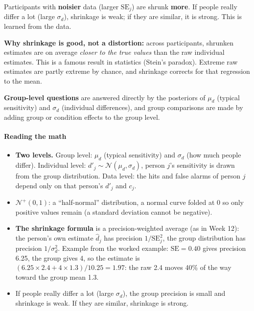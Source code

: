 Participants with \textbf{noisier} data (larger \(\mathrm{SE}_j\)) are
shrunk \textbf{more}. If people really differ a lot (large
\(\sigma_d\)), shrinkage is weak; if they are similar, it is strong.
This is learned from the data.

\textbf{Why shrinkage is good, not a distortion:} across participants,
shrunken estimates are on average \emph{closer to the true values} than
the raw individual estimates. This is a famous result in statistics
(Stein's paradox). Extreme raw estimates are partly extreme by chance,
and shrinkage corrects for that regression to the mean.

\textbf{Group-level questions} are answered directly by the posteriors
of \(\mu_d\) (typical sensitivity) and \(\sigma_d\) (individual
differences), and group comparisons are made by adding group or
condition effects to the group level.

\paragraph{Reading the math}

\begin{itemize}
\tightlist
\item
  \textbf{Two levels.} Group level: \(\mu_d\) (typical sensitivity) and
  \(\sigma_d\) (how much people differ). Individual level:
  \(d'_j \sim \mathcal{N}(\mu_d, \sigma_d)\), person \(j\)'s sensitivity
  is drawn from the group distribution. Data level: the hits and false
  alarms of person \(j\) depend only on that person's \(d'_j\) and
  \(c_j\).
\item
  \(\mathcal{N}^{+}(0, 1)\): a ``half-normal'' distribution, a normal
  curve folded at 0 so only positive values remain (a standard deviation
  cannot be negative).
\item
  \textbf{The shrinkage formula} is a precision-weighted average (as in
  Week 12): the person's own estimate \(\hat d_j\) has precision
  \(1/\mathrm{SE}_j^2\), the group distribution has precision
  \(1/\sigma_d^2\). Example from the worked example:
  \(\mathrm{SE} = 0.40\) gives precision 6.25, the group gives 4, so the
  estimate is \((6.25 \times 2.4 + 4 \times 1.3)/10.25 = 1.97\): the raw
  2.4 moves 40\% of the way toward the group mean 1.3.
\item
  If people really differ a lot (large \(\sigma_d\)), the group
  precision is small and shrinkage is weak. If they are similar,
  shrinkage is strong.
\end{itemize}

